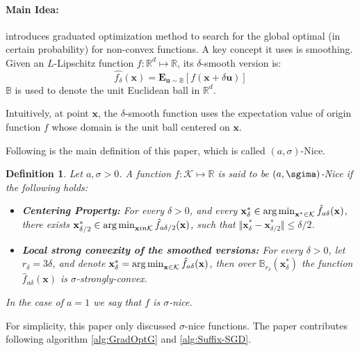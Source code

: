 \paragraph{Main Idea:}
\cite{Hazan2015} introduces  graduated optimization method to search for the global optimal (in certain probability) for non-convex functions. A key concept it uses is smoothing. Given an $L$-Lipschitz function $f: \mathbb{R}^d \mapsto \mathbb{R}$, its $\delta$-smooth version is:
$$
\hat{f_\delta}(\mathbf{x}) = \mathbf{E}_{\mathbf{u}\sim\mathbb{B}}[f(\mathbf{x}+\delta\mathbf{u})]
$$
$\mathbb{B}$ is used to denote the unit Euclidean ball in $\mathbb{R}^d$. 

Intuitively, at point $\mathbf{x}$, the $\delta$-smooth function uses the expectation value of origin function $f$ whose domain is the unit ball centered on $\mathbf{x}$.

Following is the main definition of this paper, which is called $(a, \sigma)$-Nice.
\newtheorem{sigma-Nice}{Definition}
\begin{sigma-Nice}
Let $a, \sigma > 0$. A function $f: \mathcal{K} \mapsto \mathbb{R}$ is said to be $(a, \sgima)$-Nice if the following holds:

\begin{itemize}
    \item \textbf{Centering Property:} For every $\delta > 0$, and every $\mathbf{x}^*_\delta \in \operatorname*{arg\,min}_{\mathbf{x}^* \in \mathcal{K}} \hat{f}_{a\delta}(\mathbf{x})$, there exists $\mathbf{x}^*_{\delta/2} \in \operatorname*{arg\,min}_{\mathbf{x} in \mathcal{K}} \hat{f}_{a\delta/2}(\mathbf{x})$, such that $\Vert\mathbf{x}^*_{\delta} - \mathbf{x}^*_{\delta/2}\Vert \leq \delta/2$.
    \item \textbf{Local strong convexity of the smoothed versions:} For every $\delta > 0 $, let $r_\delta = 3\delta$, and denote $\mathbf{x}^*_{\delta} = \operatorname*{arg\,min}_{\mathbf{x} \in \mathcal{K}} \hat{f}_{a\delta}(\mathbf{x})$, then over $\mathbb{B}_{r_\delta}(\mathbf{x}^*_{\delta})$ the function $\hat{f}_{a\delta}(\mathbf{x})$ is $\sigma$-strongly-convex.
\end{itemize}
In the case of $a=1$ we say that $f$ is $\sigma$-nice.
\end{sigma-Nice}

For simplicity, this paper only discussed $\sigma$-nice functions. The paper contributes following algorithm \ref{alg:GradOptG} and \ref{alg:Suffix-SGD}.

